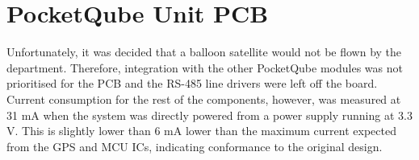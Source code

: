 \section{PocketQube Unit PCB}

Unfortunately, it was decided that a balloon satellite would not be flown by the department. Therefore, integration with the other PocketQube modules was not prioritised for the PCB and the RS-485 line drivers were left off the board. Current consumption for the rest of the components, however, was measured at 31 mA when the system was directly powered from a power supply running at 3.3 V. This is slightly lower than 6 mA lower than the maximum current expected from the GPS and MCU ICs, indicating conformance to the original design.